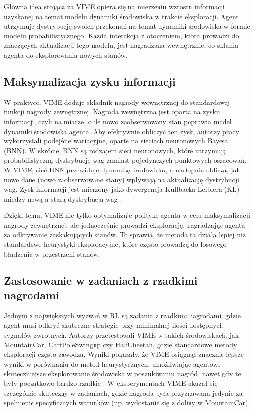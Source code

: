 Główna idea stojąca za VIME opiera się na mierzeniu wzrostu informacji uzyskanej na temat modelu dynamiki środowiska w trakcie eksploracji. Agent utrzymuje dystrybucję swoich przekonań na temat dynamiki środowiska w formie modelu probabilistycznego. Każda interakcja z otoczeniem, która prowadzi do znaczących aktualizacji tego modelu, jest nagradzana wewnętrznie, co skłania agenta do eksplorowania nowych stanów.

\subsection{Maksymalizacja zysku informacji}
W praktyce, VIME dodaje składnik nagrody wewnętrznej do standardowej funkcji nagrody zewnętrznej. Nagroda wewnętrzna jest oparta na zysku informacji, czyli na miarze, o ile nowo zaobserwowany stan poprawia model dynamiki środowiska agenta. Aby efektywnie obliczyć ten zysk, autorzy pracy \cite{VIME} wykorzystali podejście wariacyjne, oparte na sieciach neuronowych Bayesa (BNN). W skrócie, BNN są rodzajem sieci neuronowych, które utrzymują probabilistyczną dystrybucję wag zamiast pojedynczych punktowych oszacowań. W VIME, sieć BNN przewiduje dynamikę środowiska, a następnie oblicza, jak nowe dane (nowo zaobserwowane stany) wpływają na aktualizację dystrybucji wag. Zysk informacji jest mierzony jako dywergencja Kullbacka-Leiblera (KL) między nową a starą dystrybucją wag \cite{VIME}.

Dzięki temu, VIME nie tylko optymalizuje politykę agenta w celu maksymalizacji nagrody zewnętrznej, ale jednocześnie prowadzi eksplorację, nagradzając agenta za odkrywanie zaskakujących stanów. To sprawia, że metoda ta działa lepiej niż standardowe heurystyki eksploracyjne, które często prowadzą do losowego błądzenia w przestrzeni stanów.

\subsection{Zastosowanie w zadaniach z rzadkimi nagrodami}
Jednym z największych wyzwań w RL są zadania z rzadkimi nagrodami, gdzie agent musi odkryć skuteczne strategie przy minimalnej ilości dostępnych sygnałów zwrotnych. Autorzy przetestowali VIME w takich środowiskach, jak MountainCar, CartPoleSwingup czy HalfCheetah, gdzie standardowe metody eksploracji często zawodzą. Wyniki pokazały, że VIME osiągnął znacznie lepsze wyniki w porównaniu do metod heurystycznych, umożliwiając agentowi skuteczniejsze eksplorowanie środowiska w poszukiwaniu nagród, nawet gdy te były początkowo bardzo rzadkie \cite{VIME}. W eksperymentach VIME okazał się szczególnie skuteczny w zadaniach, gdzie nagroda była przyznawana jedynie za spełnienie specyficznych warunków (np. wydostanie się z doliny w MountainCar).


